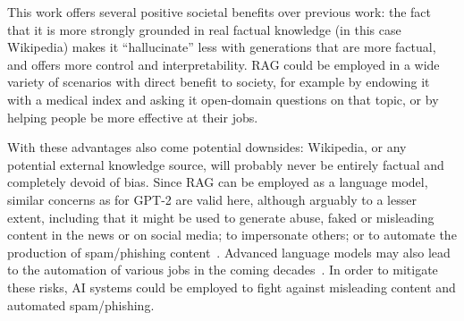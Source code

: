 \documentclass{article}
\begin{document}


This work offers several positive societal benefits over previous work: the fact that it is more strongly grounded in real factual knowledge (in this case Wikipedia) makes it ``hallucinate'' less with generations that are more factual, and offers more control and interpretability. RAG could be employed in a wide variety of scenarios with direct benefit to society, for example by endowing it with a medical index and asking it open-domain questions on that topic, or by helping people be more effective at their jobs.

With these advantages also come potential downsides: Wikipedia, or any potential external knowledge source, will probably never be entirely factual and completely devoid of bias. Since RAG can be employed as a language model, similar concerns as for GPT-2 \cite{radford2019language} are valid here, although arguably to a lesser extent, including that it might be used to generate abuse, faked or misleading content in the news or on social media; to impersonate others; or to automate the production of spam/phishing content~\cite{solaiman2019release}. Advanced language models may also lead to the automation of various jobs in the coming decades~\cite{grace2017when}.
In order to mitigate these risks, AI systems could be employed to fight against misleading content and automated spam/phishing.
\end{document}
